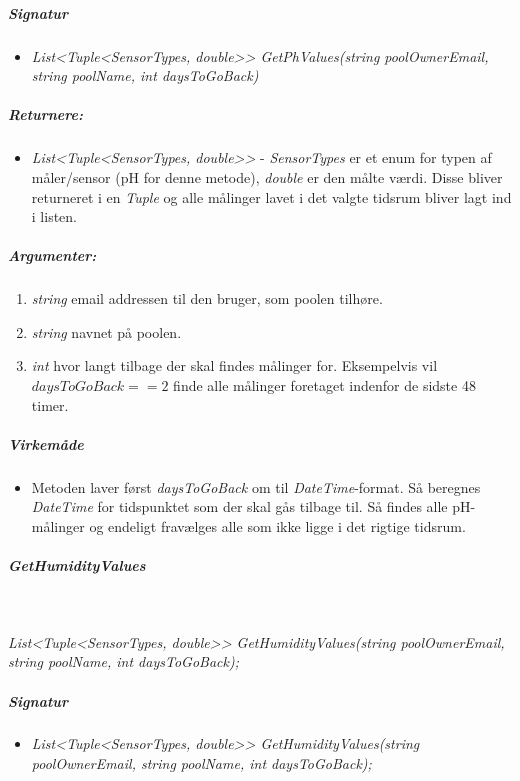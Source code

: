 \subparagraph{Signatur}
\begin{itemize}
	\item \textit{List<Tuple<SensorTypes, double>> GetPhValues(string poolOwnerEmail, string poolName, int daysToGoBack)}
\end{itemize}

\subparagraph{Returnere:}
\begin{itemize}
	\item \textit{List<Tuple<SensorTypes, double>>} - \textit{SensorTypes} er et enum for typen af måler/sensor (pH for denne metode), \textit{double} er den målte værdi. Disse bliver returneret i en \textit{Tuple} og alle målinger lavet i det valgte tidsrum bliver lagt ind i listen.
\end{itemize}

\subparagraph{Argumenter:}
\begin{enumerate}
	\item \textit{string} email addressen til den bruger, som poolen tilhøre.
	\item \textit{string} navnet på poolen.
	\item \textit{int} hvor langt tilbage der skal findes målinger for. Eksempelvis vil $daysToGoBack == 2$ finde alle målinger foretaget indenfor de sidste 48 timer.
\end{enumerate}

\subparagraph{Virkemåde}
\begin{itemize}
	\item Metoden laver først \textit{daysToGoBack} om til \textit{DateTime}-format. Så beregnes \textit{DateTime} for tidspunktet som der skal gås tilbage til. Så findes alle pH-målinger og endeligt fravælges alle som ikke ligge i det rigtige tidsrum.
\end{itemize}









\subparagraph{GetHumidityValues}\ %

\textit{List<Tuple<SensorTypes, double>> GetHumidityValues(string poolOwnerEmail, string poolName, int daysToGoBack);}







\subparagraph{Signatur}
\begin{itemize}
	\item \textit{List<Tuple<SensorTypes, double>> GetHumidityValues(string poolOwnerEmail, string poolName, int daysToGoBack);}
\end{itemize}

